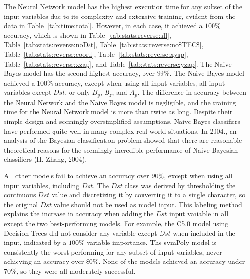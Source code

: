 \documentclass[sn-mathphys-num]{sn-jnl}%
\begin{document}
The Neural Network model has the highest execution time for any subset of the input variables due to its complexity and extensive training, evident from the data in Table~\ref{tab:time:total}. However, in each case, it achieved a $100\%$ accuracy, which is shown in Table~\ref{tab:stats:reverse:all}, Table~\ref{tab:stats:reverse:noDst}, Table~\ref{tab:stats:reverse:no$TEC$}, Table~\ref{tab:stats:reverse:coord}, Table~\ref{tab:stats:reverse:xyap}, Table~\ref{tab:stats:reverse:xzap}, and Table~\ref{tab:stats:reverse:yzap}. The Naive Bayes model has the second highest accuracy, over $99\%$. The Naive Bayes model achieved a $100\%$ accuracy, except when using all input variables, all input variables except $Dst$, or only $B_{y}$, $B_{z}$, and $A_{p}$. The difference in accuracy between the Neural Network and the Naive Bayes model is negligible, and the training time for the Neural Network model is more than twice as long. Despite their simple design and seemingly oversimplified assumptions, Naive Bayes classifiers have performed quite well in many complex real-world situations. In 2004., an analysis of the Bayesian classification problem showed that there are reasonable theoretical reasons for the seemingly incredible performance of Naive Bayesian classifiers (H. Zhang, 2004).

All other models fail to achieve an accuracy over $90\%$, except when using all input variables, including $Dst$. The $Dst$ class was derived by thresholding the continuous $Dst$ value and discretizing it by converting it to a single character, so the original $Dst$ value should not be used as model input. This labeling method explains the increase in accuracy when adding the $Dst$ input variable in all except the two best-performing models. For example, the C5.0 model using Decision Trees did not consider any variable except $Dst$ when included in the input, indicated by a $100\%$ variable importance. The svmPoly model is consistently the worst-performing for any subset of input variables, never achieving an accuracy over $80\%$. None of the models achieved an accuracy under $70\%$, so they were all moderately successful.
\end{document}
